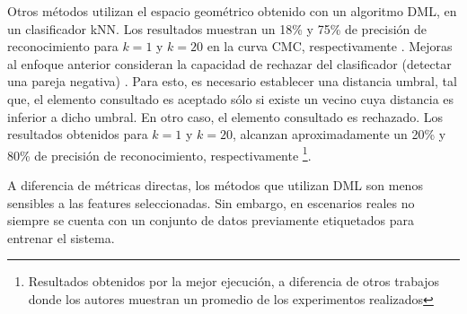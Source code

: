 \documentclass[../memoria.tex]{subfiles}
\begin{document}
\indent Otros métodos \cite{weinberger2008fast} utilizan el espacio geométrico obtenido con un algoritmo DML, en un clasificador kNN. Los resultados muestran un 18\% y 75\% de precisión de reconocimiento para $k=1$ y $k=20$ en la curva CMC, respectivamente \cite{hirzer2012relaxed}. Mejoras al enfoque anterior consideran la capacidad de rechazar %
del clasificador (detectar una pareja negativa) \cite{dikmen2011pedestrian}. Para esto, es necesario establecer una distancia umbral, tal que, el elemento consultado es aceptado sólo si existe un vecino cuya distancia es inferior a dicho umbral. En otro caso, el elemento consultado es rechazado. Los resultados obtenidos para $k=1$ y $k=20$, alcanzan aproximadamente un 20\% y 80\% de precisión de reconocimiento, respectivamente \footnote{\label{lmnn-r}Resultados obtenidos por la mejor ejecución, a diferencia de otros trabajos donde los autores muestran un promedio de los experimentos realizados}. %

\indent A diferencia de métricas directas, los métodos que utilizan DML son menos sensibles a las features seleccionadas. Sin embargo, en escenarios reales no siempre se cuenta con un conjunto de datos previamente etiquetados para entrenar el sistema.
\end{document}
